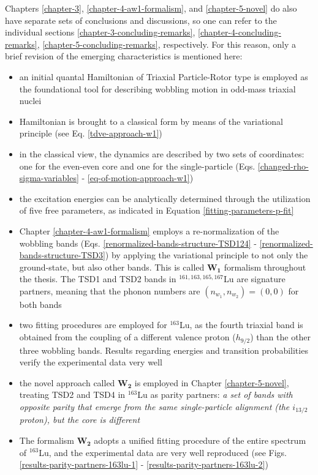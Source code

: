 Chapters \ref{chapter-3}, \ref{chapter-4-aw1-formalism}, and \ref{chapter-5-novel} do also have separate sets of conclusions and discussions, so one can refer to the individual sections \ref{chapter-3-concluding-remarks}, \ref{chapter-4-concluding-remarks}, \ref{chapter-5-concluding-remarks}, respectively. For this reason, only a brief revision of the emerging characteristics is mentioned here:
\begin{itemize}
    \item an initial quantal Hamiltonian of Triaxial Particle-Rotor type is employed as the foundational tool for describing wobbling motion in odd-mass triaxial nuclei
    \item Hamiltonian is brought to a classical form by means of the variational principle (see Eq. \eqref{tdve-approach-w1})
    \item in the classical view, the dynamics are described by two sets of coordinates: one for the even-even core and one for the single-particle (Eqs. \eqref{changed-rho-sigma-variables} - \eqref{eq-of-motion-approach-w1})
    \item the excitation energies can be analytically determined through the utilization of five free parameters, as indicated in Equation \eqref{fitting-parameters-p-fit}
    \item Chapter \ref{chapter-4-aw1-formalism} employs a re-normalization of the wobbling bands (Eqs. \eqref{renormalized-bands-structure-TSD124} - \eqref{renormalized-bands-structure-TSD3}) by applying the variational principle to not only the ground-state, but also other bands. This is called $\mathbf{W_1}$ formalism throughout the thesis. The TSD1 and TSD2 bands in $^{161,163,165,167}$Lu are signature partners, meaning that the phonon numbers are $(n_{w_1},n_{w_2})=(0,0)$ for both bands
    \item two fitting procedures are employed for $^{163}$Lu, as the fourth triaxial band is obtained from the coupling of a different valence proton ($h_{9/2}$) than the other three wobbling bands. Results regarding energies and transition probabilities verify the experimental data very well
    \item the novel approach called $\mathbf{W_2}$ is employed in Chapter \ref{chapter-5-novel}, treating TSD2 and TSD4 in $^{163}$Lu as parity partners: \emph{a set of bands with opposite parity that emerge from the same single-particle alignment (the $i_{13/2}$ proton), but the core is different}
    \item The formalism $\mathbf{W_2}$ adopts a unified fitting procedure of the entire spectrum of $^{163}$Lu, and the experimental data are very well reproduced (see Figs. \ref{results-parity-partners-163lu-1} - \ref{results-parity-partners-163lu-2})

\end{itemize}
